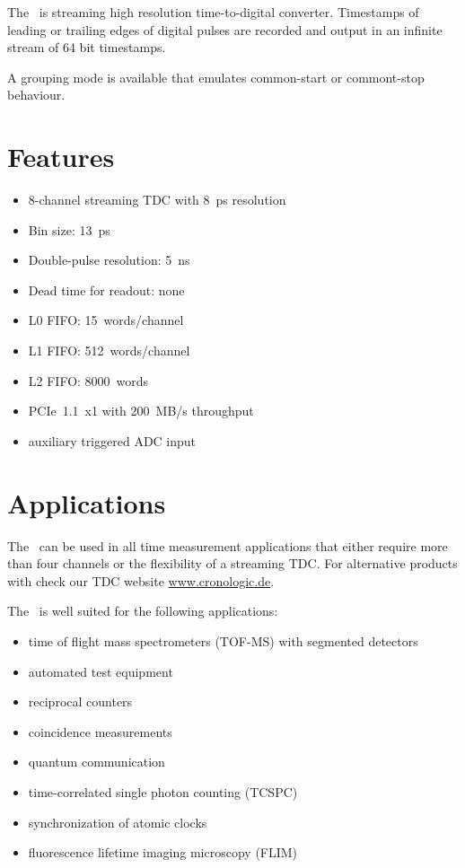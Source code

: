 The \deviceName\ is streaming high resolution time-to-digital converter. 
Timestamps of leading or trailing edges of digital pulses are recorded and output in an infinite stream of 64 bit timestamps.

A grouping mode is available that emulates common-start or commont-stop behaviour. 

\section{Features}
	\begin{itemize}
		\item 8-channel streaming TDC with 8~ps resolution
		\item Bin size: 13~ps
		\item Double-pulse resolution: 5~ns
		\item Dead time for readout: none
		\item L0 FIFO: 15~words/channel
		\item L1 FIFO: 512~words/channel
		\item L2 FIFO: 8000~words
		\item PCIe~1.1~x1 with 200~MB/s throughput
		\item auxiliary triggered ADC input
	\end{itemize} 
\section{Applications}
The \deviceName\ can be used in all time measurement applications that either require more than four channels or the flexibility of a streaming TDC. 
For alternative products with check our TDC website \href{https://www.cronologic.de/produkte/products-overview#tdcdata}{www.cronologic.de}.

The \deviceName\ is well suited for the following applications:
\begin{itemize}
	\item time of flight mass spectrometers (TOF-MS) with segmented detectors
	\item automated test equipment
	\item reciprocal counters
	\item coincidence measurements
	\item quantum communication
	\item time-correlated single photon counting (TCSPC)
	\item synchronization of atomic clocks
	\item fluorescence lifetime imaging microscopy (FLIM)
\end{itemize} 